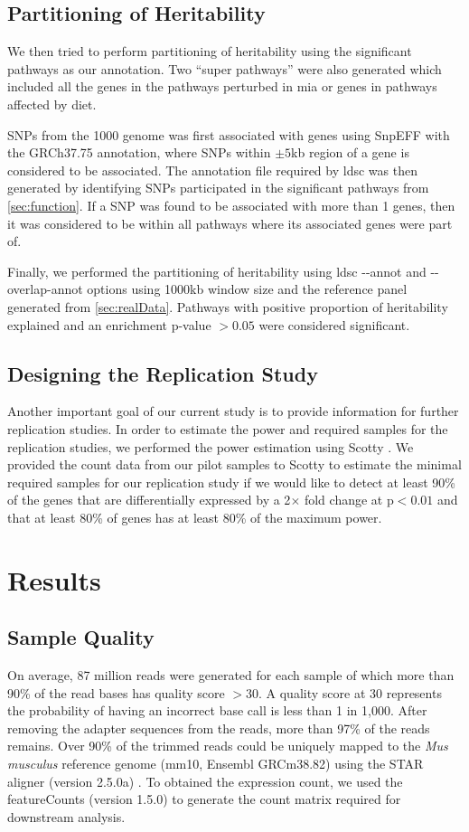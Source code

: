 \subsection{Partitioning of Heritability}
We then tried to perform partitioning of heritability using the significant pathways as our annotation.
Two ``super pathways'' were also generated which included all the genes in the pathways perturbed in \gls{mia} or genes in pathways affected by diet. 

\glspl{SNP} from the 1000 genome was first associated with genes using SnpEFF \citep{Cingolani2012} with the GRCh37.75 annotation, where \glspl{SNP} within $\pm5$\gls{kb} region of a gene is considered to be associated.
The annotation file required by \gls{ldsc} was then generated by identifying \glspl{SNP} participated in the significant pathways from \cref{sec:function}.
If a \gls{SNP} was found to be associated with more than 1 genes, then it was considered to be within all pathways where its associated genes were part of. 

Finally, we performed the partitioning of heritability using \gls{ldsc} \citep{Bulik-Sullivan2015} -{}-annot and -{}-overlap-annot options using 1000\gls{kb} window size and the reference panel generated from \cref{sec:realData}.
Pathways with positive proportion of heritability explained and an enrichment p-value $>0.05$ were considered significant. 

\subsection{Designing the Replication Study}
Another important goal of our current study is to provide information for further replication studies. 
In order to estimate the power and required samples for the replication studies, we performed the power estimation using Scotty \citep{Busby2013}.
We provided the count data from our pilot samples to Scotty to estimate the minimal required samples for our replication study if we would like to detect at least 90\% of the genes that are differentially expressed by a 2$\times$ fold change at p$<0.01$ and that at least 80\% of genes has at least 80\% of the maximum power.

\section{Results} 
\subsection{Sample Quality}
On average, 87 million reads were generated for each sample of which more than 90\% of the read bases has quality score $>30$.
A quality score at 30 represents the probability of having an incorrect base call is less than 1 in 1,000.
After removing the adapter sequences from the reads, more than 97\% of the reads remains.
Over 90\% of the trimmed reads could be uniquely mapped to the \textit{Mus musculus} reference genome (mm10, Ensembl GRCm38.82) using the STAR aligner (version 2.5.0a) \citep{Dobin2013}.
To obtained the expression count, we used the featureCounts (version 1.5.0) \citep{Liao2014} to generate the count matrix required for downstream analysis.

